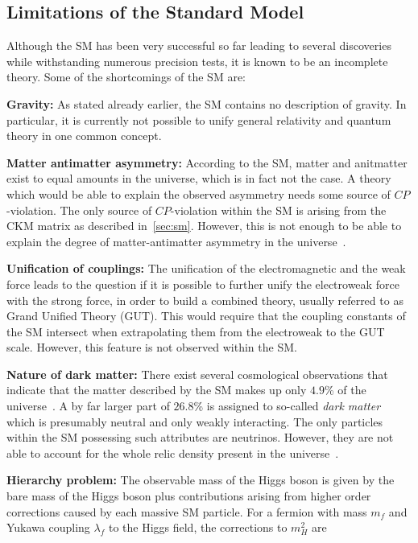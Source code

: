 \subsection{Limitations of the Standard Model}
\label{subsec:sm_shortcomings}
Although the SM has been very successful so far leading to several discoveries while withstanding numerous precision tests, it is known to be an incomplete theory. Some of the shortcomings of the SM are:
\begin{description}
\item \textbf{Gravity:} As stated already earlier, the SM contains no description of gravity. In particular, it is currently not possible to unify general relativity and quantum theory in one common concept.
\item \textbf{Matter antimatter asymmetry:} According to the SM, matter and anitmatter exist to equal amounts in the universe, which is in fact not the case. A theory which would be able to explain the observed asymmetry needs some source of $CP$-violation. The only source of $CP$-violation within the SM is arising from the CKM matrix as described in~\ref{sec:sm}. However, this is not enough to be able to explain the degree of matter-antimatter asymmetry in the universe~\cite{bib:CPViolation}.    
\item \textbf{Unification of couplings:} The unification of the electromagnetic and the weak force leads to the question if it is possible to further unify the electroweak force with the strong force, in order to build a combined theory, usually referred to as Grand Unified Theory (GUT). This would require that the coupling constants of the SM intersect when extrapolating them from the electroweak to the GUT scale. However, this feature is not observed within the SM.
\item \textbf{Nature of dark matter:} There exist several cosmological observations that indicate that the matter described by the SM makes up only $4.9$\% of the universe~\cite{Ade:2013zuv}. A by far larger part of $26.8$\% is assigned to so-called \textit{dark matter} which is presumably neutral and only weakly interacting. The only particles within the SM possessing such attributes are neutrinos. However, they are not able to account for the whole relic density present in the universe~\cite{Bertone:2004pz}. 
\item \textbf{Hierarchy problem:} The observable mass of the Higgs boson is given by the bare mass of the Higgs boson plus contributions arising from higher order corrections caused by each massive SM particle. For a fermion with mass $m_f$ and Yukawa coupling $\lambda_f$ to the Higgs field, the corrections to $m_H^2$ are

\end{description}
